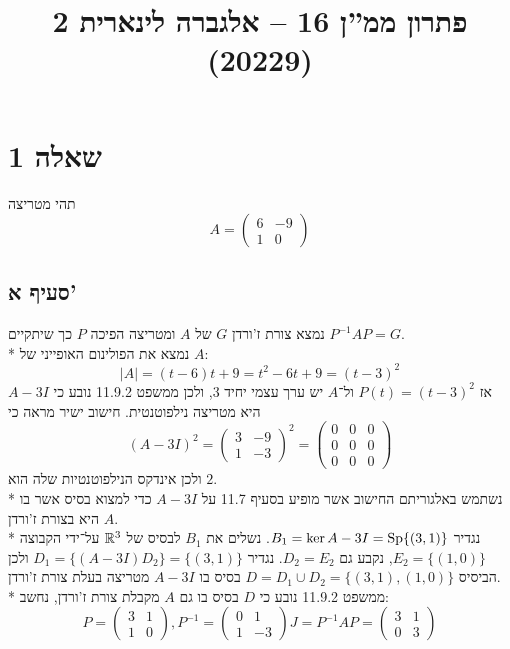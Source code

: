 
\title{פתרון ממ''ן 16 – אלגברה לינארית 2 (20229)}


\maketitle

\section{שאלה 1}
תהי מטריצה
\[
	A = \begin{pmatrix}
		6 & -9 \\
		1 & 0
	\end{pmatrix}
\]
\subsection{סעיף א'}
נמצא צורת ז'ורדן $G$ של $A$ ומטריצה הפיכה $P$ כך שיתקיים $P^{-1} A P = G$. \\*
נמצא את הפולינום האופייני של $A$:
\[
	|A| = (t - 6) t + 9 = t^2 - 6t + 9 = {(t - 3)}^2
\]
אז $P(t) = {(t - 3)}^2$ ול־$A$ יש ערך עצמי יחיד $3$, ולכן ממשפט 11.9.2 נובע כי $A - 3I$ היא מטריצה נילפוטנטית.
חישוב ישיר מראה כי
\[
	{(A - 3I)}^2
	= \begin{pmatrix}
		3 & -9 \\
		1 & -3
	\end{pmatrix}^2
	= \begin{pmatrix}
		0 & 0 & 0 \\
		0 & 0 & 0 \\
		0 & 0 & 0
	\end{pmatrix}
\]
ולכן אינדקס הנילפוטנטיות שלה הוא $2$. \\*
נשתמש באלגוריתם החישוב אשר מופיע בסעיף 11.7 על $A - 3I$ כדי למצוא בסיס אשר בו $A$ היא בצורת ז'ורדן. \\*
נגדיר $B_1 = \ker A - 3I = \operatorname{Sp}\{ (3, 1) \}$. נשלים את $B_1$ לבסיס של $\mathbb{R}^3$ על־ידי הקבוצה $E_2 = \{ (1, 0) \}$, נקבע גם $D_2 = E_2$. 
נגדיר $D_1 = \{ (A - 3I) D_2 \} = \{ (3, 1) \}$ ולכן הביסיס $D = D_1 \cup D_2 = \{ (3, 1), (1, 0) \}$ בסיס בו $A - 3I$ מטריצה בעלת צורת ז'ורדן. \\*
ממשפט 11.9.2 נובע כי $D$ בסיס בו גם $A$ מקבלת צורת ז'ורדן, נחשב:
\[
	P = \begin{pmatrix}
		3 & 1 \\
		1 & 0
	\end{pmatrix},
	P^{-1} = \begin{pmatrix}
		0 & 1 \\
		1 & -3
	\end{pmatrix}
	J = P^{-1} A P
	= \begin{pmatrix}
		3 & 1 \\
		0 & 3
	\end{pmatrix}
\]

